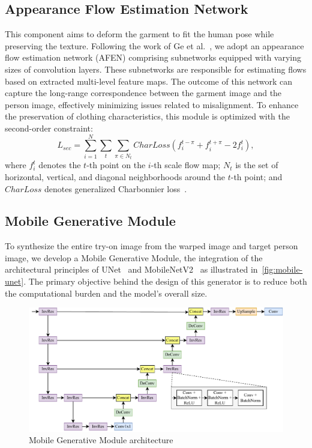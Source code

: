 \subsection{Appearance Flow Estimation Network}
This component aims to deform the garment to fit the human pose while preserving the texture. Following the work of Ge et al.~\cite{Ge-CVPR2021-Parser}, we adopt an appearance flow estimation network (AFEN) comprising subnetworks equipped with varying sizes of convolution layers. These subnetworks are responsible for estimating flows based on extracted multi-level feature maps. The outcome of this network can capture the long-range correspondence between the garment image and the person image, effectively minimizing issues related to misalignment. To enhance the preservation of clothing characteristics, this module is optimized with the second-order constraint:
\begin{equation} 
L_{sec}=\sum_{i=1}^N \sum_t \sum_{\pi \in N_t} CharLoss\left(f_i^{t-\pi}+f_i^{t+\pi}-2 f_i^t\right),
\end{equation}
where $f_i^t$ denotes the $t$-th point on the $i$-th scale flow map; $N_t$ is the set of horizontal, vertical, and diagonal neighborhoods around the $t$-th point; and $CharLoss$ denotes generalized Charbonnier loss~\cite{Sun-IJCV2014-Quantitative}.

\subsection{Mobile Generative Module}
To synthesize the entire try-on image from the warped image and target person image, we develop a Mobile Generative Module, the integration of the architectural principles of UNet~\cite{Ronneberger-MICCAI2015-Unet} and MobileNetV2~\cite{Sandler-CVPR2018-Mobilenetv2} as illustrated in~\autoref{fig:mobile-unet}. The primary objective behind the design of this generator is to reduce both the computational burden and the model's overall size.

\begin{figure}[h!]
  \centering
  \includegraphics[width=\linewidth]{content/resources/images/tryon/mobile-unet.pdf}
  \caption{Mobile Generative Module architecture}
  \label{fig:mobile-unet}
  \vspace{-2mm}
\end{figure}

